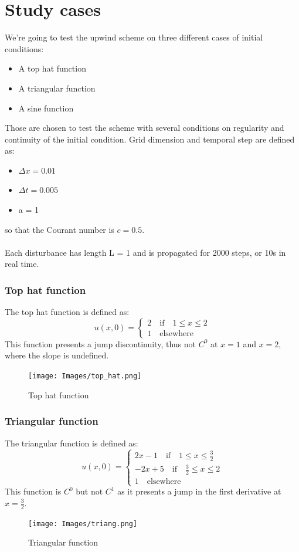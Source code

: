 \documentclass{report}
\begin{document}
\section*{Study cases}
We're going to test the upwind scheme on three different cases of initial conditions:
\begin{itemize}
    \item A top hat function
    \item A triangular function
    \item A sine function
\end{itemize}
Those are chosen to test the scheme with several conditions on regularity and continuity of the initial condition.
Grid dimension and temporal step are defined as:
\begin{itemize}[label={}]
    \item $\Delta x = 0.01$
    \item $\Delta t = 0.005$
    \item a = 1
\end{itemize}
so that the Courant number is $c = 0.5$.\\\\
Each disturbance has length L = 1 and is propagated for 2000 steps, or 10s in real time.
\subsubsection*{Top hat function}
The top hat function is defined as:
\begin{equation*}
    u(x,0) = \begin{cases}
        2 \quad \textrm{if} \quad 1 \leq x \leq 2 \\
        1 \quad \textrm{elsewhere}
    \end{cases}
\end{equation*}
This function presents a jump discontinuity, thus not $C^0$ at $x = 1$ and $x = 2$, where the slope is undefined.
\begin{figure}[H]
    \centering
    \texttt{[image: Images/top\_hat.png]}
    \caption{Top hat function}
    \label{fig:top_hat}
\end{figure}
\subsubsection*{Triangular function}
The triangular function is defined as:
\begin{equation*}
    u(x,0) = \begin{cases}
        2x - 1 \quad \textrm{if} \quad 1 \leq x \leq \frac{3}{2} \\
        -2x+5 \quad \textrm{if} \quad \frac{3}{2} \leq x \leq 2  \\
        1 \quad \textrm{elsewhere}
    \end{cases}
\end{equation*}
This function is $C^0$ but not $C^1$ as it presents a jump in the first derivative at $x = \frac{3}{2}$.
\begin{figure}[H]
    \centering
    \texttt{[image: Images/triang.png]}
    \caption{Triangular function}
    \label{fig:triang}
\end{figure}
\end{document}
